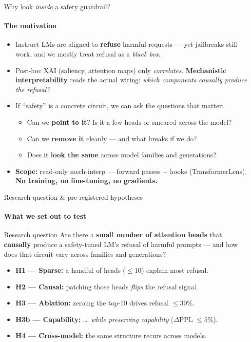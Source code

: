 \documentclass[aspectratio=169]{beamer}
\newcommand{\hl}[1]{\textcolor{themeblue}{\textbf{#1}}}
\newcommand{\hlo}[1]{\textcolor{themeorange!75!black}{\textbf{#1}}}
\begin{document}
\begin{frame}{Why look \emph{inside} a safety guardrail?}
  \framesubtitle{The motivation}
  \begin{itemize}
    \item Instruct LMs are aligned to \hl{refuse} harmful requests --- yet jailbreaks still work, and we mostly treat refusal as a \emph{black box}.
    \item Post-hoc XAI (saliency, attention maps) only \emph{correlates}. \hl{Mechanistic interpretability} reads the actual wiring: \emph{which components causally produce the refusal?}
    \item If ``safety'' is a concrete circuit, we can ask the questions that matter:
      \begin{itemize}
        \item Can we \hlo{point to it}? Is it a few heads or smeared across the model?
        \item Can we \hlo{remove it} cleanly --- and what breaks if we do?
        \item Does it \hlo{look the same} across model families and generations?
      \end{itemize}
    \item \textbf{Scope:} read-only mech-interp --- forward passes + hooks (TransformerLens). \hl{No training, no fine-tuning, no gradients.}
  \end{itemize}
\end{frame}

\begin{frame}{Research question \& pre-registered hypotheses}
  \framesubtitle{What we set out to test}
  \begin{block}{Research question}
    Are there a \hl{small number of attention heads} that \hl{causally} produce a safety-tuned LM's refusal of harmful prompts --- and how does that circuit vary across families and generations?
  \end{block}
  \vspace{2pt}
  \begin{itemize}
    \item \textbf{H1 --- Sparse:} a handful of heads ($\le 10$) explain most refusal.
    \item \textbf{H2 --- Causal:} patching those heads \emph{flips} the refusal signal.
    \item \textbf{H3 --- Ablation:} zeroing the top-10 drives refusal $\le 30\%$.
    \item \textbf{H3b --- Capability:} \dots\ \emph{while preserving capability} ($\Delta$PPL $\le 5\%$).
    \item \textbf{H4 --- Cross-model:} the same structure recurs across models.
  \end{itemize}
\end{frame}
\end{document}
